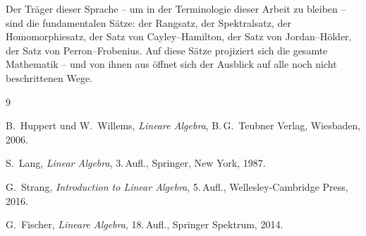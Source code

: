 ﻿\documentclass[a4paper,12pt]{report}
\theoremstyle{definition}
\begin{document}
Der Träger dieser Sprache -- um in der Terminologie dieser Arbeit
zu bleiben -- sind die fundamentalen Sätze: der Rangsatz,
der Spektralsatz, der Homomorphiesatz, der Satz von Cayley--Hamilton,
der Satz von Jordan--Hölder, der Satz von Perron--Frobenius.
Auf diese Sätze projiziert sich die gesamte Mathematik --
und von ihnen aus öffnet sich der Ausblick auf alle noch
nicht beschrittenen Wege.

\begin{thebibliography}{9}

B.~Huppert und W.~Willems,
\textit{Lineare Algebra},
B.\,G.~Teubner Verlag, Wiesbaden, 2006.

S.~Lang,
\textit{Linear Algebra},
3.\,Aufl., Springer, New York, 1987.

G.~Strang,
\textit{Introduction to Linear Algebra},
5.\,Aufl., Wellesley-Cambridge Press, 2016.

G.~Fischer,
\textit{Lineare Algebra},
18.\,Aufl., Springer Spektrum, 2014.

\end{thebibliography}
\end{document}
